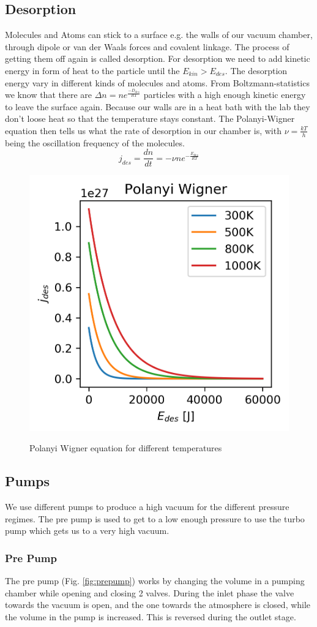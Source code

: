 \documentclass[]{article}
\begin{document}
\subsection{Desorption}
Molecules and Atoms can stick to a surface e.g. the walls of our vacuum chamber, through dipole or van der Waals forces and covalent linkage. The process of getting them off again is called desorption. For desorption we need to add kinetic energy in form of heat to the particle until the $E_{kin}>E_{des}$. The desorption energy vary in different kinds of molecules and atoms. From Boltzmann-statistics we know that there are $\Delta n=ne^{\frac{-D_{des}}{RT}}$ particles with a high enough kinetic energy to leave the surface again. Because our walls are in a heat bath with the lab they don't loose heat so that the temperature stays constant. The Polanyi-Wigner equation then tells us what the rate of desorption in our chamber is, with $\nu=\frac{kT}{h}$ being the oscillation frequency of the molecules.\[ j_{des}=\frac{dn}{dt}=-\nu n e^{-\frac{E_{des}}{RT}} \] 
\begin{figure}[h]
	\includegraphics[width=0.7\linewidth]{"Plots/Polanyi Wigner"}
	\label{fig:polanyi}
	\caption{Polanyi Wigner equation for different temperatures}
\end{figure}


\subsection{Pumps}
We use different pumps to produce a high vacuum for the different pressure regimes. The pre pump is used to get to a low enough pressure to use the turbo pump which gets us to a very high vacuum.
\subsubsection{Pre Pump}
The pre pump (Fig. \ref{fig:prepump}) works by changing the volume in a pumping chamber while opening and closing 2 valves. During the inlet phase the valve towards the vacuum is open, and the one towards the atmosphere is closed, while the volume in the pump is increased. This is reversed during the outlet stage.
\end{document}
